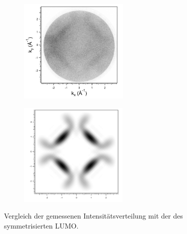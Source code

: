         \begin{figure}
            \centering
            \begin{subfigure}[t]{0.48\textwidth}
                \centering
                \includegraphics[height=5cm]{./content/pictures/FeO+5A/FeO_5A_34_80eV.png}
            \end{subfigure}
            \begin{subfigure}[t]{0.48\textwidth}
                \centering
                \includegraphics[height=5cm]{./content/pictures/FeO+5A/MO_LUMO_RT_RT.png}
            \end{subfigure}
            \caption{Vergleich der gemessenen Intensitätsverteilung mit der des symmetrisierten LUMO.}
            \label{fig:FeO5A1}
        \end{figure}
